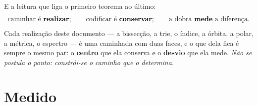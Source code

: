 \documentclass[livro.tex]{subfiles}
\begin{document}
\medskip\noindent E a leitura que liga o primeiro teorema ao último:
\[
\text{caminhar é \textbf{realizar}};\qquad
\text{codificar é \textbf{conservar}};\qquad
\text{a dobra \textbf{mede} a diferença.}
\]
Cada realização deste documento --- a bissecção, a trie, o índice, a órbita, a
polar, a métrica, o espectro --- é uma caminhada com duas faces, e o que dela fica
é sempre o mesmo par: o \textbf{centro} que ela conserva e o \textbf{desvio} que
ela mede. \emph{Não se postula o ponto: constrói-se o caminho que o determina.}

\section{Medido}\label{fis:medido}
\end{document}
